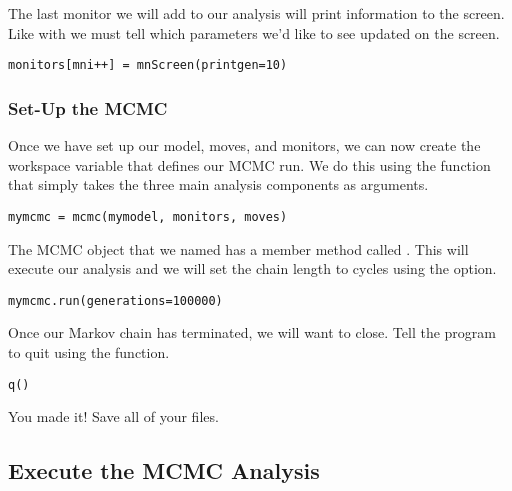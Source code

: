 The last monitor we will add to our analysis will print information to the screen.
Like with  we must tell  which parameters we'd like to see updated on the screen. 
{\tt \begin{snugshade*}
\begin{lstlisting}
monitors[mni++] = mnScreen(printgen=10)
\end{lstlisting}
\end{snugshade*}}

\medskip
\subsubsection{Set-Up the MCMC}

Once we have set up our model, moves, and monitors, we can now create the workspace variable that defines our MCMC run. 
We do this using the  function that simply takes the three main analysis components as arguments.
{\tt \begin{snugshade*}
\begin{lstlisting}
mymcmc = mcmc(mymodel, monitors, moves)\end{lstlisting}
\end{snugshade*}}

The MCMC object that we named  has a member method called . 
This will execute our analysis and we will set the chain length to  cycles using the  option.
{\tt \begin{snugshade*}
\begin{lstlisting}
mymcmc.run(generations=100000)
\end{lstlisting}
\end{snugshade*}}

Once our Markov chain has terminated, we will want \RevBayes to close. 
Tell the program to quit using the  function.
{\tt \begin{snugshade*}
\begin{lstlisting}
q()
\end{lstlisting}
\end{snugshade*}}

{\begin{framed}
You made it! Save all of your files.
\end{framed}}

\bigskip
\subsection{Execute the MCMC Analysis}\label{subsect:Exercise-RunMCMC}

